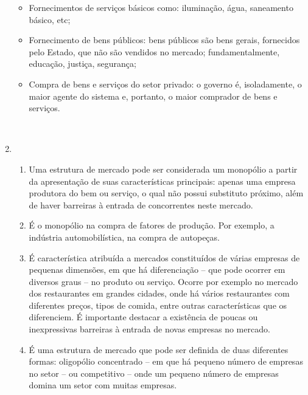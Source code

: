 \documentclass[a4paper, 12pt]{article}
\begin{document}
\begin{enumerate}
\begin{itemize}
		\item Fornecimentos de serviços básicos como: iluminação, água, saneamento básico, etc;\\

		\item Fornecimento de bens públicos: bens públicos são bens gerais, fornecidos pelo Estado, que não são vendidos no mercado; fundamentalmente, educação, justiça, segurança;\\

		\item Compra de bens e serviços do setor privado: o governo é, isoladamente, o maior agente do sistema e, portanto, o maior comprador de bens e serviços.\\
	\end{itemize}
	\\

	\item
	\begin{enumerate}
		\item Uma estrutura de mercado pode ser considerada um monopólio a partir da apresentação de suas características principais: apenas uma empresa produtora do bem ou serviço, o qual não possui substituto próximo, além de haver barreiras à entrada de concorrentes neste mercado.\\

		\item É o monopólio na compra de fatores de produção. Por exemplo, a indústria automobilística, na compra de autopeças.\\

		\item É característica atribuída a mercados constituídos de várias empresas de pequenas dimensões, em que há diferenciação – que pode ocorrer em diversos graus – no produto ou serviço. Ocorre por exemplo no mercado dos restaurantes em grandes cidades, onde há vários restaurantes com diferentes preços, tipos de comida, entre outras características que os diferenciem. É importante destacar a existência de poucas ou inexpressivas barreiras à entrada de novas empresas no mercado. \\
		
		\item É uma estrutura de mercado que pode ser definida de duas diferentes formas: oligopólio concentrado – em que há pequeno número de empresas no setor – ou competitivo – onde um pequeno número de empresas domina um setor com muitas empresas.\\
		

\end{enumerate}
\end{enumerate}
\end{document}
